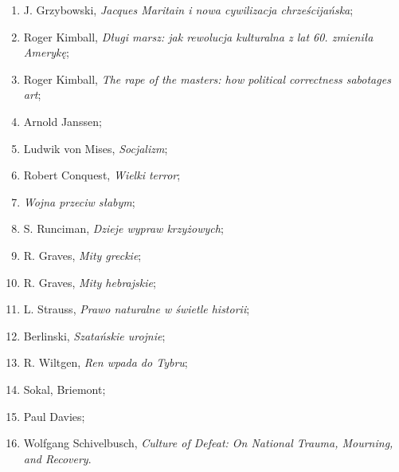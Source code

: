 \documentclass[a4paper,11pt]{article}
\begin{document}
\begin{enumerate}
{    Michaela Novaka};
\item J. Grzybowski, \emph{Jacques Maritain i nowa cywilizacja
    chrześcijańska};
\item Roger Kimball, \emph{Długi marsz: jak rewolucja kulturalna z lat
    60. zmieniła Amerykę};
\item Roger Kimball, \emph{The rape of the masters: how political
    correctness sabotages art};
\item Arnold Janssen;
\item Ludwik von Mises, \emph{Socjalizm};
\item Robert Conquest, \emph{Wielki terror};
\item \emph{Wojna przeciw słabym};
\item S. Runciman, \emph{Dzieje wypraw krzyżowych};
\item R. Graves, \emph{Mity greckie};
\item R. Graves, \emph{Mity hebrajskie};
\item L. Strauss, \emph{Prawo naturalne w świetle historii};
\item Berlinski, \emph{Szatańskie urojnie};
\item R. Wiltgen, \emph{Ren wpada do Tybru};
\item Sokal, Briemont;
\item Paul Davies;
\item Wolfgang Schivelbusch, \emph{Culture of Defeat: On National
    Trauma, Mourning, and Recovery}.
\end{enumerate}
\end{document}
